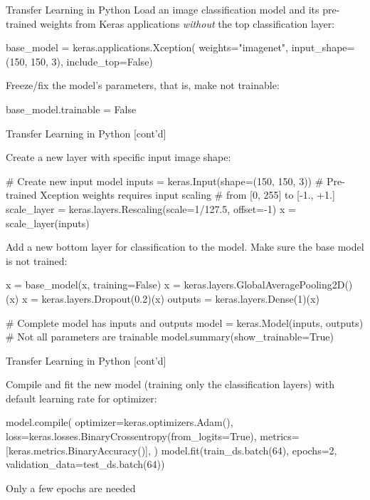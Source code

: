 \documentclass[ignorenonframetext,xcolor=x11names]{beamer}
\begin{document}
\begin{frame}[label=withcode,fragile]{Transfer Learning in Python}
Load an image classification model and its  pre-trained  weights from Keras applications \emph{without} the top classification layer:
\begin{pythoncode}
base_model = keras.applications.Xception(
    weights="imagenet",
    input_shape=(150, 150, 3),
    include_top=False)
\end{pythoncode}

Freeze/fix the model's parameters, that is, make not trainable:
\begin{pythoncode}
base_model.trainable = False
\end{pythoncode}
\end{frame}

\begin{frame}[label=withcode,fragile]{Transfer Learning in Python \small [cont'd]}

Create a new layer with specific input image shape:
\begin{pythoncode}
# Create new input model
inputs = keras.Input(shape=(150, 150, 3))
# Pre-trained Xception weights requires input scaling
# from [0, 255] to [-1., +1.]
scale_layer = keras.layers.Rescaling(scale=1/127.5, offset=-1)
x = scale_layer(inputs)
\end{pythoncode}

Add a new bottom layer for classification to the model. Make sure the base model is not trained:
\begin{pythoncode}
x = base_model(x, training=False)
x = keras.layers.GlobalAveragePooling2D()(x)
x = keras.layers.Dropout(0.2)(x)
outputs = keras.layers.Dense(1)(x)

# Complete model has inputs and outputs
model = keras.Model(inputs, outputs)
# Not all parameters are trainable
model.summary(show_trainable=True)
\end{pythoncode}
\end{frame}

\begin{frame}[label=withcode,fragile]{Transfer Learning in Python \small [cont'd]}

Compile and fit the new model (training only the classification layers) with default learning rate for optimizer:
\begin{pythoncode}
model.compile(
    optimizer=keras.optimizers.Adam(),
    loss=keras.losses.BinaryCrossentropy(from_logits=True),
    metrics=[keras.metrics.BinaryAccuracy()],
)
model.fit(train_ds.batch(64), epochs=2, 
          validation_data=test_ds.batch(64))
\end{pythoncode}
\begin{block}{}
Only a few epochs are needed
\end{block}

\end{frame}
\end{document}
